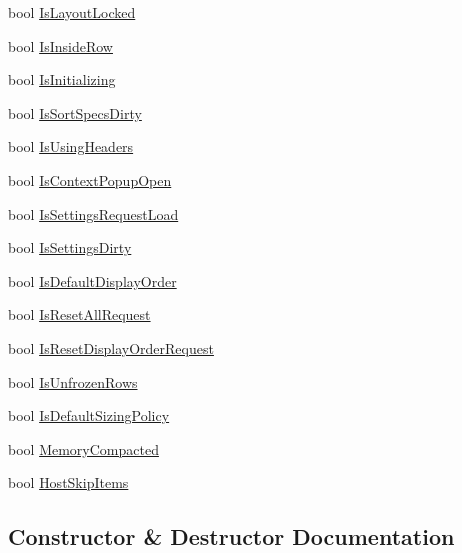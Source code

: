 \begin{DoxyCompactItemize}
\item 
bool \hyperlink{structImGuiTable_a1596be40e96bb5faa7aad3fd50291e33}{Is\+Layout\+Locked}
\item 
bool \hyperlink{structImGuiTable_a32f59376aae5cbe008c49605be3cd007}{Is\+Inside\+Row}
\item 
bool \hyperlink{structImGuiTable_a28cdc6e10e4295c6548660b2c31ad593}{Is\+Initializing}
\item 
bool \hyperlink{structImGuiTable_a066141fe3c9b74ec5492d4acd4f1a21a}{Is\+Sort\+Specs\+Dirty}
\item 
bool \hyperlink{structImGuiTable_aa24819d7de86a33a491b909cfb00251c}{Is\+Using\+Headers}
\item 
bool \hyperlink{structImGuiTable_a5345136b8044075f539c4fbe7cc4b53b}{Is\+Context\+Popup\+Open}
\item 
bool \hyperlink{structImGuiTable_ab1f0c3a1a1c500cb5b3a3e1cd2761519}{Is\+Settings\+Request\+Load}
\item 
bool \hyperlink{structImGuiTable_a4c0a3b840b7a5c111551e1e8a6ad6c3a}{Is\+Settings\+Dirty}
\item 
bool \hyperlink{structImGuiTable_aa7f7e814cd813fd5de652ae315c8c135}{Is\+Default\+Display\+Order}
\item 
bool \hyperlink{structImGuiTable_a2d066ad49460272713bd6c9beba4a1cc}{Is\+Reset\+All\+Request}
\item 
bool \hyperlink{structImGuiTable_ab1e0c549a7c1de0ffbd14c18ae7bb402}{Is\+Reset\+Display\+Order\+Request}
\item 
bool \hyperlink{structImGuiTable_a011cb090506f53f6fed0a395b1ac1c22}{Is\+Unfrozen\+Rows}
\item 
bool \hyperlink{structImGuiTable_a84bfdcc0efeb85cf6f103ddf166e4c65}{Is\+Default\+Sizing\+Policy}
\item 
bool \hyperlink{structImGuiTable_aa6825c0891fe234c20d5f92e33725d0d}{Memory\+Compacted}
\item 
bool \hyperlink{structImGuiTable_a202de697d7aabc75e0d06d4b700cacdd}{Host\+Skip\+Items}
\end{DoxyCompactItemize}


\subsection{Constructor \& Destructor Documentation}
\mbox{\label{structImGuiTable_ad9cfd8be1defebf32b2b2d7fcd5fd152}} 

